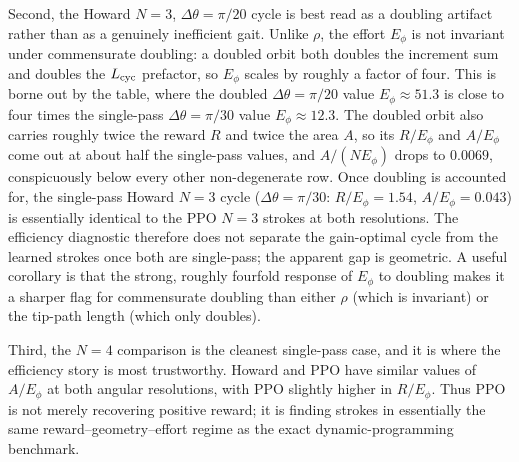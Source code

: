 \documentclass[11pt]{article}
\begin{document}
Second, the Howard $N=3$, $\Delta\theta=\pi/20$ cycle is best read as a doubling artifact rather than as a genuinely inefficient gait. Unlike $\rho$, the effort $E_\phi$ is not invariant under commensurate doubling: a doubled orbit both doubles the increment sum and doubles the $L_{\rm cyc}$ prefactor, so $E_\phi$ scales by roughly a factor of four. This is borne out by the table, where the doubled $\Delta\theta=\pi/20$ value $E_\phi\approx 51.3$ is close to four times the single-pass $\Delta\theta=\pi/30$ value $E_\phi\approx 12.3$. The doubled orbit also carries roughly twice the reward $R$ and twice the area $A$, so its $R/E_\phi$ and $A/E_\phi$ come out at about half the single-pass values, and $A/(N E_\phi)$ drops to $0.0069$, conspicuously below every other non-degenerate row. Once doubling is accounted for, the single-pass Howard $N=3$ cycle ($\Delta\theta=\pi/30$: $R/E_\phi=1.54$, $A/E_\phi=0.043$) is essentially identical to the PPO $N=3$ strokes at both resolutions. The efficiency diagnostic therefore does not separate the gain-optimal cycle from the learned strokes once both are single-pass; the apparent gap is geometric. A useful corollary is that the strong, roughly fourfold response of $E_\phi$ to doubling makes it a sharper flag for commensurate doubling than either $\rho$ (which is invariant) or the tip-path length (which only doubles).

Third, the $N=4$ comparison is the cleanest single-pass case, and it is where the efficiency story is most trustworthy. Howard and PPO have similar values of $A/E_\phi$ at both angular resolutions, with PPO slightly higher in $R/E_\phi$. Thus PPO is not merely recovering positive reward; it is finding strokes in essentially the same reward--geometry--effort regime as the exact dynamic-programming benchmark.
\end{document}
